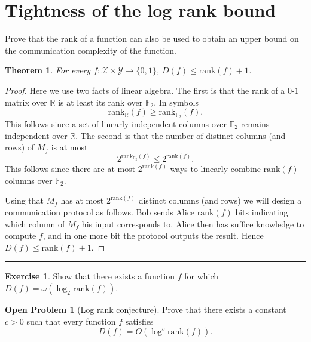 \documentclass[11pt]{amsart}
\theoremstyle{plain}
\newtheorem{theorem}{Theorem}
\theoremstyle{definition}
\newtheorem{exercise}{Exercise}
\newtheorem{open}{Open Problem}
\theoremstyle{plain}
\newcommand{\calX}{\mathcal{X}}
\newcommand{\calY}{\mathcal{Y}}
\newcommand{\rank}{\mathrm{rank}}
\newcommand{\exercises}{\bigskip \noindent\rule{8cm}{0.4pt} \medskip}
\begin{document}
\newpage \section{Tightness of the log rank bound}

Prove that the rank of a function can also be used to obtain an upper bound on the communication complexity of the function.

\begin{theorem}
For every $f : \calX \times \calY \to \{0,1\}$, $D(f) \le \rank(f) + 1$.
\end{theorem}

\begin{proof}
Here we use two facts of linear algebra. The first is that the rank of a $0$-$1$ matrix over $\mathbb{R}$ is at least its rank over $\mathbb{F}_2$. In symbols $$\rank_\mathbb{R}(f) \geq \rank_{\mathbb{F}_2}(f).$$
This follows since a set of linearly independent columns over $\mathbb{F}_2$ remains independent over $\mathbb{R}$.
The second is that the number of distinct columns (and rows) of $M_f$ is at most $$2^{\rank_{\mathbb{F}_2}(f)} \leq 2^{\rank(f)}.$$
This follows since there are at most $2^{\rank(f)}$ ways to linearly combine $\rank(f)$ columns over $\mathbb{F}_2$.

Using that $M_f$ has at most $2^{\rank(f)}$ distinct columns (and rows) we will design a communication protocol as follows. Bob sends Alice $\rank(f)$ bits indicating which column of $M_f$ his input corresponds to. Alice then has suffice knowledge to compute $f$, and in one more bit the protocol outputs the result. Hence
$D(f) \leq \rank(f) + 1$.
\end{proof}

\exercises

\begin{exercise} %
Show that there exists a function $f$ for which $D(f) = \omega( \log_2 \rank(f) )$.
\end{exercise}

\begin{open}[Log rank conjecture]
Prove that there exists a constant $c > 0$ such that every function $f$ satisfies
\[
D(f) = O( \log^c \rank(f)).
\]
\end{open}
\end{document}
